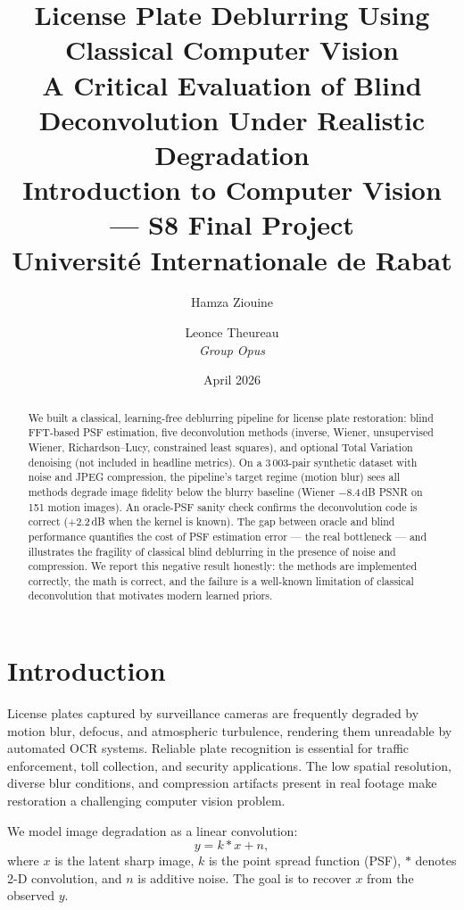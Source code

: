\documentclass[12pt,a4paper]{article}
\title{
  \textbf{License Plate Deblurring Using Classical Computer Vision} \\[0.3cm]
  \large A Critical Evaluation of Blind Deconvolution Under Realistic Degradation \\
  Introduction to Computer Vision --- S8 Final Project \\
  Universit\'e Internationale de Rabat
}
\author{
  Hamza Ziouine \and Leonce Theureau \\[0.2cm]
  \textit{Group Opus}
}
\date{April 2026}
\begin{document}
\maketitle

\begin{abstract}
We built a classical, learning-free deblurring pipeline for license plate
restoration: blind FFT-based PSF estimation, five deconvolution methods
(inverse, Wiener, unsupervised Wiener, Richardson--Lucy, constrained
least squares), and optional Total Variation denoising (not included in headline metrics). On a 3\,003-pair synthetic
dataset with noise and JPEG compression, the pipeline's target regime
(motion blur) sees all methods degrade image fidelity below the blurry
baseline (Wiener $-$8.4\,dB PSNR on 151 motion images). An oracle-PSF
sanity check confirms the deconvolution code is correct ($+$2.2\,dB when
the kernel is known). The gap between oracle and blind performance
quantifies the cost of PSF estimation error --- the real bottleneck ---
and illustrates the fragility of classical blind deblurring in the
presence of noise and compression. We report this negative result
honestly: the methods are implemented correctly, the math is correct,
and the failure is a well-known limitation of classical deconvolution
that motivates modern learned priors.
\end{abstract}

\section{Introduction}

License plates captured by surveillance cameras are frequently degraded
by motion blur, defocus, and atmospheric turbulence, rendering them
unreadable by automated OCR systems. Reliable plate recognition is
essential for traffic enforcement, toll collection, and security
applications. The low spatial resolution, diverse blur conditions, and
compression artifacts present in real footage make restoration a
challenging computer vision problem.

We model image degradation as a linear convolution:
\begin{equation}
  y = k \ast x + n,
  \label{eq:degradation}
\end{equation}
where $x$ is the latent sharp image, $k$ is the point spread function
(PSF), $\ast$ denotes 2-D convolution, and $n$ is additive noise. The
goal is to recover $x$ from the observed $y$.
\end{document}
